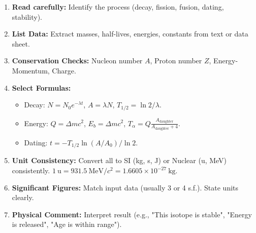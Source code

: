 \documentclass[11pt]{article}
\begin{document}
\begin{methode}
\begin{enumerate}
\item \textbf{Read carefully:} Identify the process (decay, fission, fusion, dating, stability).
\item \textbf{List Data:} Extract masses, half-lives, energies, constants from text or data sheet.
\item \textbf{Conservation Checks:} Nucleon number $A$, Proton number $Z$, Energy-Momentum, Charge.
\item \textbf{Select Formulas:}
\begin{itemize}
\item Decay: $N=N_0 e^{-\lambda t}$, $A=\lambda N$, $T_{1/2}=\ln 2/\lambda$.
\item Energy: $Q = \Delta m c^2$, $E_b = \Delta m c^2$, $T_\alpha = Q \frac{A_{\text{daughter}}}{A_{\text{daughter}}+4}$.
\item Dating: $t = -T_{1/2} \ln(A/A_0)/\ln 2$.
\end{itemize}
\item \textbf{Unit Consistency:} Convert all to SI (kg, s, J) or Nuclear (u, MeV) consistently. $1\ \text{u} = 931.5\ \text{MeV}/c^2 = 1.6605 \times 10^{-27}\ \text{kg}$.
\item \textbf{Significant Figures:} Match input data (usually 3 or 4 s.f.). State units clearly.
\item \textbf{Physical Comment:} Interpret result (e.g., "This isotope is stable", "Energy is released", "Age is within range").
\end{enumerate}
\end{methode}
\end{document}
